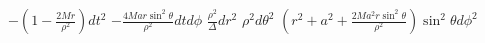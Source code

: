 $-(1 - \frac{2 M r}{\rho^2}) dt^2$
$- \frac{4 M a r \sin^2\theta}{\rho^2} dt d\phi$
$\frac{\rho^2}{\Delta} dr^2$
$\rho^2 d\theta^2$
$(r^2 + a^2 + \frac{2 M a^2 r \sin^2\theta}{\rho^2}) \sin^2\theta d\phi^2$
